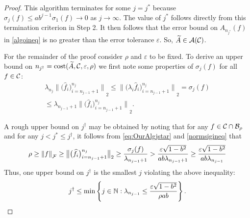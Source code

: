 \documentclass[graybox,footinfo]{svmult}
\newcommand{\DHJRnorm}[2][{}]{\ensuremath{\left \lVert #2 \right \rVert}_{#1}}
\newcommand{\DHJRbignorm}[2][{}]{\ensuremath{\bigl \lVert #2 \bigr \rVert}_{#1}}
\begin{document}
\begin{proof}
This algorithm terminates for some $j = j^*$ because $\sigma_j(f) \le ab^{j-1} \sigma_{1}(f) \to 0$ as $j \to \infty$. The value of $j^*$ follows directly from this termination criterion in Step 2.  It then follows that the error bound on $A_{n_{j^*}}(f)$ in \eqref{algoineq} is no greater than the error tolerance $\varepsilon$.  So, $\widetilde{A} \in {\mathcal{A}}({\mathcal{C}})$.

For the remainder of the proof consider $\rho$ and $\varepsilon$ to be fixed.  To derive an upper bound on $n_{j^\dagger} = \textup{cost}(\widetilde{A},{\mathcal{C}},\varepsilon,\rho)$ we first note some properties of $\sigma_j(f)$ for all $f \in {\mathcal{C}}$:
\begin{multline} \label{normsigineq}
\lambda_{n_j} \DHJRbignorm[2]{\big( \widehat{f}_i \big)_{i=n_{j-1}+1}^{n_j}} \le 
\DHJRbignorm[2]{\big( \lambda_i \widehat{f}_i \big)_{i=n_{j-1}+1}^{n_j}} = \sigma_j(f) 
\\
\le \lambda_{n_{j-1}+1} \DHJRbignorm[2]{\big( \widehat{f}_i \big)_{i=n_{j-1}+1}^{n_j}}.
\end{multline}

A rough upper bound on $j^\dagger$ may be obtained by noting that for any $f \in {\mathcal{C}} \cap {\mathcal{B}}_\rho$ and for any $j < j^* \le j^\dagger$, it follows from \eqref{eq:OurAlgjstar} and \eqref{normsigineq} that 
\begin{equation*}
\rho \ge \DHJRnorm[\calF]{f} \ge \DHJRbignorm[2]{\big( \widehat{f}_i \big)_{i=n_{j-1}+1}^{n_j}} \ge \frac{\sigma_j(f)}{\lambda_{n_{j-1}+1}} > \frac{\varepsilon\sqrt{1 - b^2}}{ab \lambda_{n_{j-1}+1}}
\ge \frac{\varepsilon\sqrt{1 - b^2}}{ab \lambda_{n_{j-1}}}
\end{equation*}
Thus, one upper bound on $j^\dagger$ is the smallest $j$ violating the above inequality:
\begin{equation} \label{jdaggerlast}
j^\dagger \le \min \left \{j \in \bbN :  \lambda_{n_{j-1}} \le \frac{\varepsilon\sqrt{1 - b^2}}{\rho ab } \right\}.
\end{equation}


\end{proof}
\end{document}
